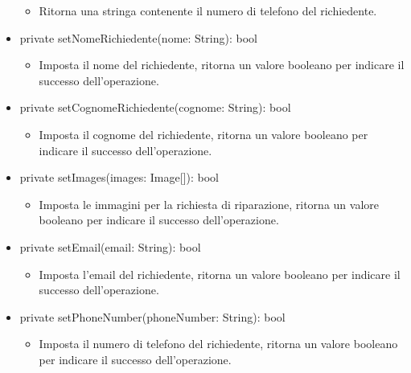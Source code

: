 \documentclass{report}
\begin{document}
\begin{itemize}
\begin{itemize}
	\item Ritorna una stringa contenente il numero di telefono del richiedente.
\end{itemize}
\item private setNomeRichiedente(nome: String): bool
\begin{itemize}
	\item Imposta il nome del richiedente, ritorna un valore booleano per indicare il successo dell'operazione.
\end{itemize}
\item private setCognomeRichiedente(cognome: String): bool
\begin{itemize}
	\item Imposta il cognome del richiedente, ritorna un valore booleano per indicare il successo dell'operazione.
\end{itemize}
\item private setImages(images: Image[]): bool
\begin{itemize}
	\item Imposta le immagini per la richiesta di riparazione, ritorna un valore booleano per indicare il successo dell'operazione.
\end{itemize}
\item private setEmail(email: String): bool
\begin{itemize}
	\item Imposta l'email del richiedente, ritorna un valore booleano per indicare il successo dell'operazione.
\end{itemize}
\item private setPhoneNumber(phoneNumber: String): bool
\begin{itemize}
	\item Imposta il numero di telefono del richiedente, ritorna un valore booleano per indicare il successo dell'operazione.
\end{itemize}
\end{itemize}
\end{document}

